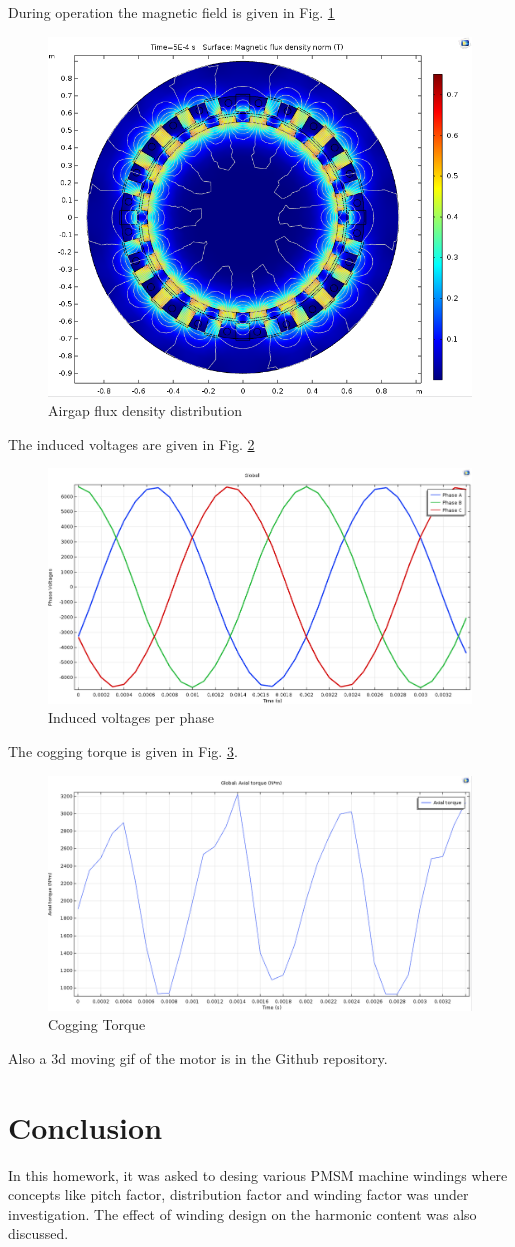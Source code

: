 \documentclass{article}
\begin{document}
During operation the magnetic field is given in Fig. \ref{fig:magneticfield}

\begin{figure}[H]
	\centering
	\includegraphics[width=0.7\linewidth]{Figurler/magneticfield}
	\caption{Airgap flux density distribution}
	\label{fig:magneticfield}
\end{figure}
 The induced voltages are given in Fig. \ref{fig:phasevoltages}
 
\begin{figure}[H]
	\centering
	\includegraphics[width=0.7\linewidth]{Figurler/phasevoltages}
	\caption{Induced voltages per phase}
	\label{fig:phasevoltages}
\end{figure}
 
 The cogging torque is given in Fig. \ref{fig:cogging}.
 
\begin{figure}[H]
	\centering
	\includegraphics[width=0.7\linewidth]{Figurler/cogging}
	\caption{Cogging Torque}
	\label{fig:cogging}
\end{figure}
Also a 3d moving gif of the motor is in the Github repository. 
 \section{Conclusion}
 In this homework, it was asked to desing various PMSM machine windings where concepts like pitch factor, distribution factor and winding factor was under investigation. The effect of winding design on the harmonic content was also discussed.
\end{document}
